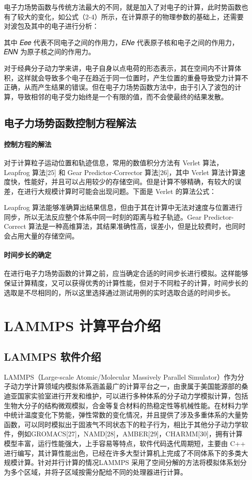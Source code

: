 电子力场势函数与传统方法最大的不同，就是加入了对电子的计算，此时势函数也有了较大的变化，如公式（2-4）所示，在计算原子的物理参数的基础上，还需要对波包及其中的电子进行分析：

其中 𝐸𝑒𝑒 代表不同电子之间的作用力，𝐸𝑁𝑒 代表原子核和电子之间的作用力，𝐸𝑁𝑁 为原子核之间的作用力。

对于经典分子动力学来讲，电子自身以点电荷的形态表示，其在空间内不计算体积，这样就会导致多个电子在趋近于同一位置时，产生位置的重叠导致受力计算不正确，从而产生结果的错误。但在电子力场势函数方法中，由于引入了波包的计算，导致相邻的电子受力始终是一个有限的值，而不会使最终的结果发散。


\subsection{电子力场势函数控制方程解法}
\paragraph{控制方程的解法}
对于计算粒子运动位置和轨迹信息，常用的数值积分方法有 Verlet 算法， Leapfrog 算法[25] 和 Gear Predictor-Corrector 算法[26]，其中 Verlet 算法计算速度快，性能好，并且可以占用较少的存储空间。但是计算不够精确，有较大的误差，在进行大规模计算时可能会出现问题。下面是 Verlet 的算法公式：

Leapfrog 算法能够准确算出结果信息，但由于其在计算中无法对速度与位置进行同步，所以无法反应整个体系中同一时刻的距离与粒子轨迹。Gear Predictor-Correct 算法是一种高维算法，其结果准确性高，误差小，但是比较费时，也同时会占用大量的存储空间。

\paragraph{时间步长的确定}
在进行电子力场势函数的计算之前，应当确定合适的时间步长进行模拟。这样能够保证计算精度，又可以获得优秀的计算性能，但对于不同粒子的计算，时间步长的选取是不尽相同的，所以这里选择通过测试用例的实时选取合适的时间步长。


\section{LAMMPS 计算平台介绍}
\subsection{LAMMPS 软件介绍}
LAMMPS（Large-scale Atomic/Molecular Massively Parallel Simulator）作为分子动力学计算领域内模拟体系涵盖最广的计算平台之一，由隶属于美国能源部的桑迪亚国家实验室进行开发和维护，可以进行多种体系的分子动力学模拟计算，包括生物大分子的结构微观模拟，合金等复合材料的热稳定性等机械性能。在材料力学中统计温度变化下势能，弹性常数的变化情况，并且提供了涉及多重体系的大量势函数，可以同时模拟出于固液气不同状态下的粒子行为，相比于其他分子动力学软件，例如GROMACS[27]，NAMD[28]，AMBER[29]，CHARMM[30]，拥有计算模型丰富，运行性能强大，上手容易等特点，软件代码迭代周期短，主要由 C++ 进行编写，其计算性能出色，已经在许多大型计算机上完成了不同体系下的多类大规模计算。针对并行计算的情况LAMMPS 采用了空间分解的方法将模拟体系划分为多个区域，并将子区域按需分配给不同的处理器进行计算。

